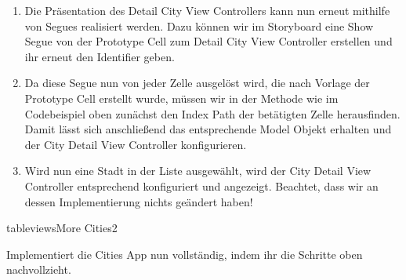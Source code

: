 \documentclass[parskip=half, final]{scrreprt}
\begin{document}
\begin{lecture}
\begin{enumerate}
\item Die Präsentation des Detail City View Controllers kann nun erneut mithilfe von Segues realisiert werden. Dazu können wir im Storyboard eine Show Segue von der Prototype Cell zum Detail City View Controller erstellen und ihr erneut den Identifier  geben.

\item Da diese Segue nun von jeder Zelle ausgelöst wird, die nach Vorlage der Prototype Cell erstellt wurde, müssen wir in der  Methode wie im Codebeispiel oben zunächst den Index Path der betätigten Zelle herausfinden. Damit lässt sich anschließend das entsprechende Model Objekt erhalten und der City Detail View Controller konfigurieren.

\item Wird nun eine Stadt in der Liste ausgewählt, wird der City Detail View Controller entsprechend konfiguriert und angezeigt. Beachtet, dass wir an dessen Implementierung nichts geändert haben!

\end{enumerate}

\begin{exc}

\begin{excitem}{tableviews}{More Cities}{2}

Implementiert die Cities App nun vollständig, indem ihr die Schritte oben nachvollzieht.

\end{excitem}

\end{exc}


\end{lecture}
\end{document}

